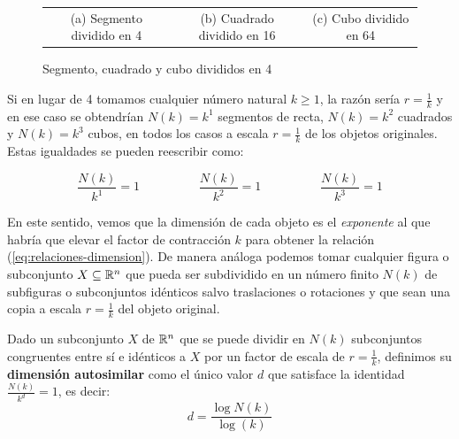 \begin{figure}[h]
\begin{tabular}{ccc}
(a) Segmento dividido en 4 & (b) Cuadrado dividido en 16 & (c) Cubo dividido en 64 \\[4pt]
\end{tabular}
\caption{Segmento, cuadrado y cubo divididos en 4}
\label{fig:divisiones}
\end{figure}

Si en lugar de 4 tomamos cualquier número natural $k\geq 1$, la razón sería $r=\frac 1 k$ y en ese caso se obtendrían $N(k)=k^1$ segmentos de recta, $N(k)=k^2$ cuadrados y $N(k)=k^3$ cubos, en todos los casos a escala $r=\frac 1 k$ de los objetos originales. Estas igualdades se pueden reescribir como:

\begin{equation}\label{eq:relaciones-dimension}
\frac{N(k)}{k^1}=1 \hspace{2cm} \frac{N(k)}{k^2}=1 \hspace{2cm} \frac{N(k)}{k^3}=1
\end{equation}

En este sentido, vemos que la dimensión de cada objeto es el \textit{exponente} al que habría que elevar el factor de contracción $k$ para obtener la relación (\ref{eq:relaciones-dimension}). De manera análoga podemos tomar cualquier figura o subconjunto $X\subseteq \mathbb{R}^n$ que pueda ser subdividido en un número finito $N(k)$ de subfiguras o subconjuntos idénticos salvo traslaciones o rotaciones y que sean una copia a escala $r=\frac 1 k$ del objeto original.

\begin{definicion}
Dado un subconjunto $X$ de $\mathbb{R}^n$ que se puede dividir en $N(k)$ subconjuntos congruentes entre sí e idénticos a $X$ por un factor de escala de $r=\frac 1 k$, definimos su \textbf{dimensión autosimilar} como el único valor $d$ que satisface la identidad $\frac{N(k)}{k^d}=1$, es decir: 
$$
d=\frac{\log N(k)}{\log(k)}
$$
\end{definicion}

